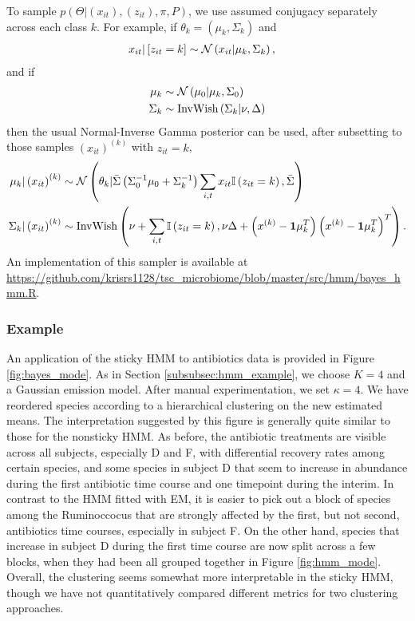 To sample $p\left(\Theta \vert \left(x_{it}\right), \left(z_{it}\right), \pi,
P\right)$, we use assumed conjugacy separately across each class $k$. For
example, if $\theta_{k} = \left(\mu_{k}, \Sigma_{k}\right)$ and
\begin{align*}
  x_{it} \vert \left[z_{it} = k\right] &\sim \mathcal{N}\left(x_{it} \vert \mu_{k}, \Sigma_{k}\right),
\end{align*}
and if
\begin{align*}
  \mu_{k} &\sim \mathcal{N}\left(\mu_{0} \vert \mu_{k}, \Sigma_{0}\right) \\
  \Sigma_{k} &\sim \text{InvWish}\left(\Sigma_{k} \vert \nu, \Delta\right)
\end{align*}
then the usual Normal-Inverse Gamma posterior can be used, after subsetting to
those samples $\left(x_{it}\right)^{(k)}$ with $z_{it} = k$,
\begin{align*}
  \mu_{k} \vert \left(x_{it}\right)^{(k)} &\sim \mathcal{N}\left(\theta_{k} \vert \bar{\Sigma}\left(\Sigma_0^{-1}\mu_{0} + \Sigma_{k}^{-1}\right) \sum_{i, t} x_{it}\mathbb{I}\left({z_{it} = k}\right), \bar{\Sigma}\right) \\
  \Sigma_{k} \vert \left(x_{it} \right)^{(k)} &\sim  \text{InvWish}\left(\nu + \sum_{i, t} \mathbb{I}\left({z_{it} = k}\right), \nu \Delta + \left(x^{(k)} - \mathbf{1} \mu_{k}^{T}\right)\left(x^{(k)} - \mathbf{1} \mu_{k}^{T}\right)^{T}\right).
\end{align*}
An implementation of this sampler is available at
\url{https://github.com/krisrs1128/tsc\_microbiome/blob/master/src/hmm/bayes\_hmm.R}.

\subsubsection{Example}
\label{subsubsec:sticky_hmm_example}

An application of the sticky HMM to antibiotics data is provided in Figure
\ref{fig:bayes_mode}. As in Section \ref{subsubsec:hmm_example}, we choose $K =
4$ and a Gaussian emission model. After manual experimentation, we set $\kappa =
4$. We have reordered species according to a hierarchical clustering on the new
estimated means. The interpretation suggested by this figure is generally quite
similar to those for the nonsticky HMM. As before, the antibiotic treatments are
visible across all subjects, especially D and F, with differential recovery
rates among certain species, and some species in subject D that seem to increase
in abundance during the first antibiotic time course and one timepoint during
the interim. In contrast to the HMM fitted with EM, it is easier to pick out a
block of species among the Ruminoccocus that are strongly affected by the first,
but not second, antibiotics time courses, especially in subject F. On the other
hand, species that increase in subject D during the first time course are now
split across a few blocks, when they had been all grouped together in Figure
\ref{fig:hmm_mode}. Overall, the clustering seems somewhat more interpretable in
the sticky HMM, though we have not quantitatively compared different metrics for
two clustering approaches.

